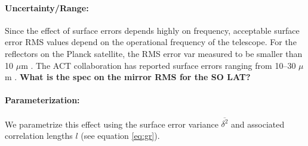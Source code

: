 \paragraph{Uncertainty/Range:}
Since the effect of surface errors depends highly on frequency, acceptable surface error RMS values depend on the operational frequency of the telescope. For the reflectors on the Planck satellite, the RMS error var measured to be smaller than 10 $\mu$m \cite{Tauber2010}. The ACT collaboration has reported surface errors ranging from 10--30 $\mu$m \cite{Hincks2008}. \textbf{What is the spec on the mirror RMS for the SO LAT?}

\paragraph{Parameterization:}
We parametrize this effect using the surface error variance $\overline{\delta^2}$ and associated correlation lengths $l$ (see equation \ref{eq:gr}). 
